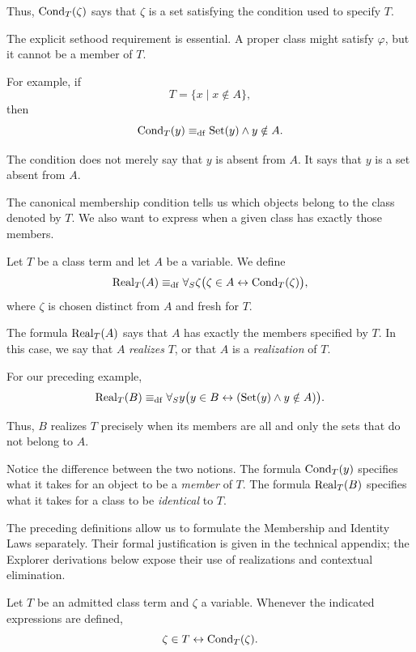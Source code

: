 Thus, \(\operatorname{Cond}_T(\zeta)\) says that \(\zeta\) is a set satisfying the condition used to specify \(T\).

The explicit sethood requirement is essential. A proper class might satisfy \(\varphi\), but it cannot be a member of \(T\).

For example, if
\[
T=\{x\mid x\notin A\},
\]
then
\[
\operatorname{Cond}_T(y)
\mathrel{\equiv_{\mathrm{df}}}
\operatorname{Set}(y)\land y\notin A.
\]

The condition does not merely say that \(y\) is absent from \(A\). It says that \(y\) is a set absent from \(A\).


The canonical membership condition tells us which objects belong to the class denoted by \(T\). We also want to express when a given class has exactly those members.

\begin{definition}
\label{def:realization-of-class-term}
Let \(T\) be a class term and let \(A\) be a variable. We define
\[
\operatorname{Real}_T(A)
\mathrel{\equiv_{\mathrm{df}}}
\forall_S\zeta
\bigl(
\zeta\in A
\leftrightarrow
\operatorname{Cond}_T(\zeta)
\bigr),
\]
where \(\zeta\) is chosen distinct from \(A\) and fresh for \(T\).
\end{definition}

The formula \(\operatorname{Real}_T(A)\) says that \(A\) has exactly the members specified by \(T\). In this case, we say that \(A\) \emph{realizes} \(T\), or that \(A\) is a \emph{realization} of \(T\).

For our preceding example,
\[
\operatorname{Real}_T(B)
\mathrel{\equiv_{\mathrm{df}}}
\forall_S y
\bigl(
y\in B
\leftrightarrow
(\operatorname{Set}(y)\land y\notin A)
\bigr).
\]

Thus, \(B\) realizes \(T\) precisely when its members are all and only the sets that do not belong to \(A\).

Notice the difference between the two notions. The formula \(\operatorname{Cond}_T(y)\) specifies what it takes for an object to be a \emph{member} of \(T\). The formula \(\operatorname{Real}_T(B)\) specifies what it takes for a class to be \emph{identical} to \(T\).


The preceding definitions allow us to formulate the Membership and Identity Laws separately. Their formal justification is given in the technical appendix; the Explorer derivations below expose their use of realizations and contextual elimination.

\begin{proposition}
\label{prop:class-builder-membership-law}
Let \(T\) be an admitted class term and \(\zeta\) a variable. Whenever the indicated expressions are defined,\[
\zeta\in T\leftrightarrow\operatorname{Cond}_T(\zeta).
\]
\end{proposition}

